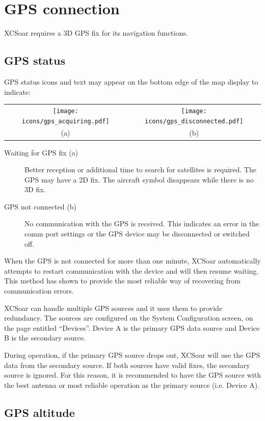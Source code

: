 \section{GPS connection}

XCSoar requires a 3D GPS fix for its navigation functions.

\subsection*{GPS status}

GPS status icons and text may appear on the bottom edge of the
map display to indicate:

\begin{tabular}{c c}%
\texttt{[image: icons/gps\_acquiring.pdf]} & \texttt{[image: icons/gps\_disconnected.pdf]}\\
(a) & (b)
\end{tabular}

\begin{description}
\item[Waiting for GPS fix (a)]  Better reception
  or additional time to search for satellites is required. The GPS may have a 2D fix.
  The aircraft symbol disappears while there is no 3D fix.
\item[GPS not connected (b)]  No communication with the GPS is received.
  This indicates an error in the comm port settings or the GPS device may
  be disconnected or switched off.
\end{description}

When the GPS is not connected for more than one minute, XCSoar automatically 
attempts to restart communication with the device and will then resume waiting. 
This method has shown to provide the most reliable way of recovering from 
communication errors.

XCSoar can handle multiple GPS sources and it uses them to provide redundancy.
The sources are configured on the System Configuration screen, on the page 
entitled ``Devices''.  Device A is the primary GPS data source and Device B is
the secondary source.

During operation, if the primary GPS source drops out, XCSoar will use the GPS 
data from the secondary source.  If both sources have valid fixes, the secondary 
source is ignored.  For this reason, it is recommended to have the GPS source 
with the best antenna or most reliable operation as the primary source (i.e. Device A).

\subsection*{GPS altitude}

